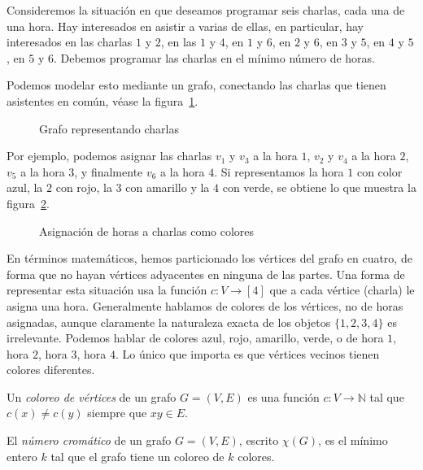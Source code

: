   \begin{example}
    Consideremos la situación
    en que deseamos programar seis charlas,
    cada una de una hora.
    Hay interesados en asistir a varias de ellas,
    en particular,
    hay interesados en las charlas \(1\) y \(2\),
    en las \(1\) y \(4\),
    en \(1\) y \(6\),
    en \(2\) y \(6\),
    en \(3\) y \(5\),
    en \(4\) y \(5\),
    en \(5\) y \(6\).
    Debemos programar las charlas en el mínimo número de horas.

    Podemos modelar esto mediante un grafo,
    conectando las charlas que tienen asistentes en común,
    véase la figura~\ref{fig:charlas}.
    \begin{figure}[htbp]
      \centering
      \caption{Grafo representando charlas}
      \label{fig:charlas}
    \end{figure}
    Por ejemplo,
    podemos asignar
    las charlas \(v_1\) y \(v_3\) a la hora \(1\),
    \(v_2\) y \(v_4\) a la hora \(2\),
    \(v_5\) a la hora \(3\),
    y finalmente \(v_6\) a la hora \(4\).
    Si representamos la hora \(1\) con color azul,
    la \(2\) con rojo,
    la \(3\) con amarillo
    y la \(4\) con verde,
    se obtiene lo que muestra la figura~\ref{fig:charlas-coloreo1}.
    \begin{figure}[htbp]
      \centering
      \caption{Asignación de horas a charlas como colores}
      \label{fig:charlas-coloreo1}
    \end{figure}

    En términos matemáticos,
    hemos particionado los vértices del grafo en cuatro,
    de forma que no hayan vértices adyacentes
    en ninguna de las partes.
    Una forma de representar esta situación usa la función
    \(c \colon V \rightarrow [4]\)
    que a cada vértice
    (charla)
    le asigna una hora.
    Generalmente hablamos de colores de los vértices,
    no de horas asignadas,
    aunque claramente la naturaleza exacta
    de los objetos \(\{1, 2, 3, 4\}\) es irrelevante.
    Podemos hablar de colores azul, rojo, amarillo, verde,
    o de hora \(1\), hora \(2\), hora \(3\), hora \(4\).
    Lo único que importa
    es que vértices vecinos tienen colores diferentes.
  \end{example}

  \begin{definition}
    Un \emph{coloreo de vértices} de un grafo \(G = (V, E)\)
    es una función \(c \colon V \rightarrow \mathbb{N}\)
    tal que \(c(x) \ne c(y)\)
    siempre que \(x y \in E\).
  \end{definition}
  \begin{definition}
    El \emph{número cromático} de un grafo \(G = (V, E)\),
    escrito \(\chi(G)\),
    es el mínimo entero \(k\)
    tal que el grafo tiene un coloreo de \(k\) colores.
  \end{definition}

